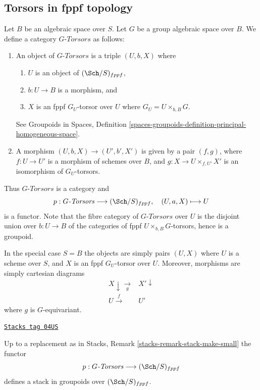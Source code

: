 \subsection{Torsors in fppf topology}
\label{examples-stacks-subsection-fppf-torsors}

Let $B$ be an algebraic space over $S$.
Let $G$ be a group algebraic space over $B$.
We define a category $G\textit{-Torsors}$ as follows:
\begin{enumerate}
\item An object of $G\textit{-Torsors}$ is a triple $(U, b, X)$ where
\begin{enumerate}
\item $U$ is an object of $(\Sch/S)_{fppf}$,
\item $b : U \to B$ is a morphism, and
\item $X$ is an fppf $G_U$-torsor over $U$ where $G_U = U \times_{b, B} G$.
\end{enumerate}
See
Groupoids in Spaces,
Definition \ref{spaces-groupoids-definition-principal-homogeneous-space}.
\item A morphism $(U, b, X) \to (U', b', X')$ is given
by a pair $(f, g)$, where $f : U \to U'$ is a morphism of schemes
over $B$, and $g : X \to U \times_{f, U'} X'$ is an
isomorphism of $G_U$-torsors.
\end{enumerate}
Thus $G\textit{-Torsors}$ is a category and
$$
p : G\textit{-Torsors} \longrightarrow (\Sch/S)_{fppf},
\quad
(U, a, X) \longmapsto U
$$
is a functor. Note that the fibre category of $G\textit{-Torsors}$
over $U$ is the disjoint union over $b : U \to B$
of the categories of fppf $U \times_{b, B} G$-torsors,
hence is a groupoid.

\medskip\noindent
In the special case $S = B$ the objects are simply pairs
$(U, X)$ where $U$ is a scheme over $S$, and $X$ is an fppf
$G_U$-torsor over $U$. Moreover, morphisms are simply cartesian
diagrams
$$
\begin{array}{cc}X \downarrow\underset{g}{\longrightarrow} & X' \downarrow \\ U \overset{f}{\longrightarrow} & U'\end{array}
$$
where $g$ is $G$-equivariant.

\begin{lemma}
\label{examples-stacks-lemma-torsors-stack-in-groupoids}
\href{https://stacks.math.columbia.edu/tag/04US}{\texttt{Stacks tag 04US}}

Up to a replacement as in
Stacks, Remark \ref{stacks-remark-stack-make-small}
the functor
$$
p : G\textit{-Torsors} \longrightarrow (\Sch/S)_{fppf}
$$
defines a stack in groupoids over $(\Sch/S)_{fppf}$.
\end{lemma}

